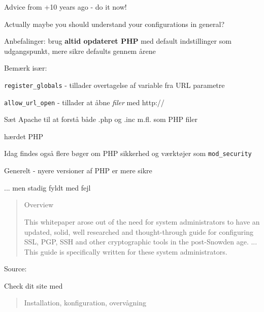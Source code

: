 \documentclass[20pt,landscape,a4paper,footrule]{foils}
\begin{document}
\centerline{Advice from +10 years ago - do it now!}

Actually maybe you should understand your configurations in general?


\begin{list1}
\item Anbefalinger: brug {\bf altid opdateret PHP} med default indstillinger
  som udgangspunkt, mere sikre defaults gennem årene
\item Bemærk især:

\begin{list2}
\item \verb+register_globals+ - tillader overtagelse af variable fra
  URL parametre
\item \verb+allow_url_open+ - tillader at åbne \emph{filer} med http://
\item Sæt Apache til at forstå både .php og .inc m.fl. som PHP filer
\end{list2}
\item hærdet PHP 
\item Idag findes også flere bøger om PHP sikkerhed og værktøjer som \verb+mod_security+
 \end{list1}

\centerline{Generelt - nyere versioner af PHP er mere sikre}

... men stadig fyldt med fejl \smiley


\begin{quote}
Overview

This whitepaper arose out of the need for system administrators to have an updated, solid, well researched and thought-through guide for configuring SSL, PGP, SSH and other cryptographic tools in the post-Snowden age. ... This guide is specifically written for these system administrators.
\end{quote}

Source: 

\centerline{Check dit site med }



\begin{quote}\Large
Installation, konfiguration, overvågning
\end{quote}
\end{document}

